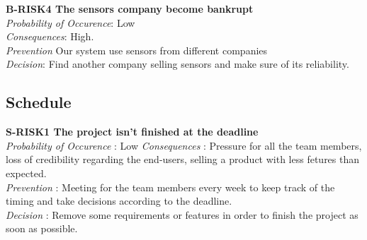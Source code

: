 	\textbf{ B-RISK4 The sensors company become bankrupt} \\
	\textit{Probability of Occurence}: Low \\
	\textit{Consequences}: High.\\
	\textit{Prevention} Our system use sensors from different companies \\
	\textit{Decision}: Find another company selling sensors and make sure of its reliability. \\

\subsection{Schedule}

	\textbf{ S-RISK1 The project isn't finished at the deadline} \\
	\textit {Probability of Occurence}  : Low
	\textit{Consequences} : Pressure for all the team members, loss of credibility regarding the end-users, selling a product with less fetures than expected.\\
	\textit{Prevention} : Meeting for the team members every week to keep track of the timing and take decisions according to the deadline. \\
	\textit{Decision} : Remove some requirements or features in order to finish the project as soon as possible.\\




